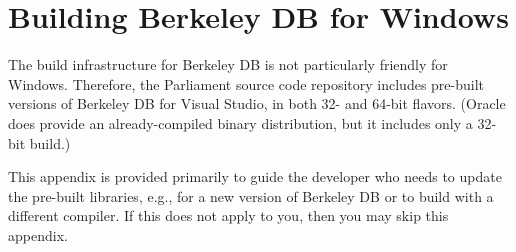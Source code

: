 
\chapter{Building Berkeley DB for Windows}
\label{chapter-building-bdb-for-windows}

The build infrastructure for Berkeley DB is not particularly friendly for Windows.  Therefore, the Parliament source code repository includes pre-built versions of Berkeley DB for Visual Studio, in both 32- and 64-bit flavors.  (Oracle does provide an already-compiled binary distribution, but it includes only a 32-bit build.)

This appendix is provided primarily to guide the developer who needs to update the pre-built libraries, e.g., for a new version of Berkeley DB or to build with a different compiler.  If this does not apply to you, then you may skip this appendix.

